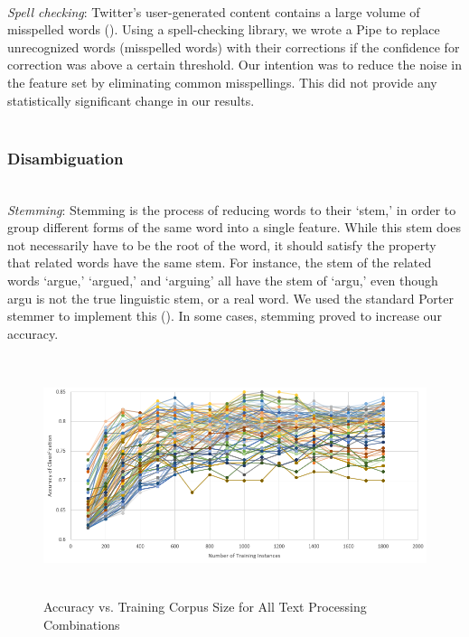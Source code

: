 \documentclass[letterpaper]{article}
\begin{document}
~\\
\textit{Spell checking}: Twitter's user-generated content contains a large volume of misspelled words (\citeauthor{Laboreiro:2010:TMM:1871840.1871853}). Using a spell-checking library, we wrote a Pipe to replace unrecognized words (misspelled words) with their corrections if the confidence for correction was above a certain threshold. Our intention was to reduce the noise in the feature set by eliminating common misspellings. This did not provide any statistically significant change in our results. \\
~\\
\subsubsection{Disambiguation}
~\\
\textit{Stemming}: Stemming is the process of reducing words to their `stem,' in order to group different forms of the same word into a single feature. While this stem does not necessarily have to be the root of the word, it should satisfy the property that related words have the same stem. For instance, the stem of the related words `argue,' `argued,' and `arguing' all have the stem of `argu,' even though argu is not the true linguistic stem, or a real word. We used the standard Porter stemmer to implement this (\citeauthor{Porter, M.}).
In some cases, stemming proved to increase our accuracy.
\\

\begin{figure}[t!]
\centering
\includegraphics[height=7cm]{chart}
\caption{Accuracy vs. Training Corpus Size for All Text Processing Combinations}
\label{fig:chart}
\end{figure}
\end{document}
